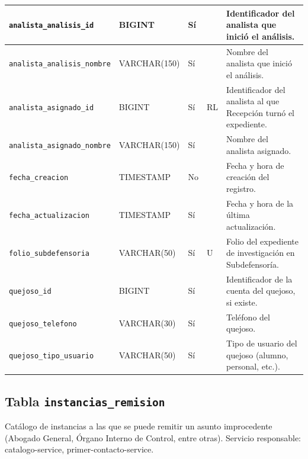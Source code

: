 \begin{longtable}{|L{3.9cm}|L{2.4cm}|L{0.9cm}|L{1.2cm}|L{6.6cm}|}
		\texttt{analista\_\allowbreak{}analisis\_\allowbreak{}id} & BIGINT & Sí &  & Identificador del analista que inició el análisis. \\ \hline
		\texttt{analista\_\allowbreak{}analisis\_\allowbreak{}nombre} & VARCHAR(150) & Sí &  & Nombre del analista que inició el análisis. \\ \hline
		\texttt{analista\_\allowbreak{}asignado\_\allowbreak{}id} & BIGINT & Sí & RL & Identificador del analista al que Recepción turnó el expediente. \\ \hline
		\texttt{analista\_\allowbreak{}asignado\_\allowbreak{}nombre} & VARCHAR(150) & Sí &  & Nombre del analista asignado. \\ \hline
		\texttt{fecha\_\allowbreak{}creacion} & TIMESTAMP & No &  & Fecha y hora de creación del registro. \\ \hline
		\texttt{fecha\_\allowbreak{}actualizacion} & TIMESTAMP & Sí &  & Fecha y hora de la última actualización. \\ \hline
		\texttt{folio\_\allowbreak{}subdefensoria} & VARCHAR(50) & Sí & U & Folio del expediente de investigación en Subdefensoría. \\ \hline
		\texttt{quejoso\_\allowbreak{}id} & BIGINT & Sí &  & Identificador de la cuenta del quejoso, si existe. \\ \hline
		\texttt{quejoso\_\allowbreak{}telefono} & VARCHAR(30) & Sí &  & Teléfono del quejoso. \\ \hline
		\texttt{quejoso\_\allowbreak{}tipo\_\allowbreak{}usuario} & VARCHAR(50) & Sí &  & Tipo de usuario del quejoso (alumno, personal, etc.). \\ \hline
\end{longtable}
\normalsize
\setlength{\tabcolsep}{6pt}
\renewcommand{\arraystretch}{1}

\subsection{Tabla \texttt{instancias\_remision}}
Catálogo de instancias a las que se puede remitir un asunto improcedente (Abogado General, Órgano Interno de Control, entre otras). Servicio responsable: catalogo-service, primer-contacto-service.


